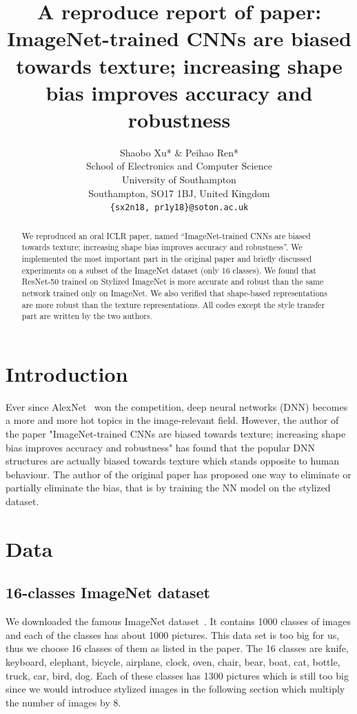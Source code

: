 \documentclass{article} %
\title{A reproduce report of paper: \\ 
ImageNet-trained CNNs are biased towards texture; increasing shape bias improves accuracy and robustness}
\author{Shaobo Xu* \& Peihao Ren*  \\
School of Electronics and Computer Science\\
University of Southampton\\
Southampton, SO17 1BJ, United Kingdom\\
\texttt{\{sx2n18, pr1y18\}@soton.ac.uk} \\
}
\begin{document}
\maketitle

\begin{abstract}

We reproduced an oral ICLR paper, named ``ImageNet-trained CNNs are biased towards texture; increasing shape bias improves accuracy and robustness''. We implemented the most important part in the original paper and briefly discussed  experiments on a subset of the ImageNet dataset (only 16 classes). 
We found that ResNet-50 trained on Stylized ImageNet is more accurate and robust than the same network trained only on ImageNet. We also verified that shape-based representations are more robust than the texture representations.
All codes except the style transfer part are written by the two authors.

\end{abstract}

\section{Introduction}

Ever since AlexNet~\cite{krizhevsky2012imagenet} won the competition, deep neural networks (DNN) becomes a more and more hot topics in the image-relevant field. However, the author of the paper "ImageNet-trained CNNs are biased towards texture; increasing shape bias improves accuracy and robustness" has found that the popular DNN structures are actually biased towards texture which stands opposite to human behaviour. The author of the original paper has proposed one way to eliminate or partially eliminate the bias, that is by training the NN model on the stylized dataset. 

\section{Data}

\subsection{16-classes ImageNet dataset}
We downloaded the famous ImageNet dataset~\cite{deng2009imagenet}. It contains 1000 classes of images and each of the classes has about 1000 pictures. This data set is too big for us, thus we choose 16 classes of them as listed in the paper. The 16 classes are knife, keyboard, elephant, bicycle, airplane, clock, oven, chair, bear, boat, cat, bottle, truck, car, bird, dog. Each of these classes has 1300 pictures which is still too big since we would introduce stylized images in the following section which multiply the number of images by 8.
\end{document}
